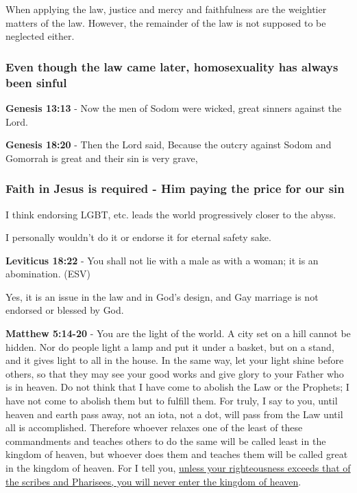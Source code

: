 \documentclass[11pt]{article}
\begin{document}
When applying the law, justice and mercy and faithfulness are the weightier matters of the law.
However, the remainder of the law is not supposed to be neglected either.

\subsubsection{Even though the law came later, homosexuality has always been sinful}
\label{sec:org1ff277d}
\textbf{Genesis 13:13} - Now the men of Sodom were wicked, great sinners against the Lord.

\textbf{Genesis 18:20} - Then the Lord said, Because the outcry against Sodom and Gomorrah is great and their sin is very grave,

\subsubsection{Faith in Jesus is required - Him paying the price for our sin}
\label{sec:org73bcf59}

I think endorsing LGBT, etc. leads the world progressively closer to the abyss.

I personally wouldn't do it or endorse it for eternal safety sake.

\textbf{Leviticus 18:22} - You shall not lie with a male as with a woman; it is an abomination. (ESV)

Yes, it is an issue in the law and in God's design, and Gay marriage is not endorsed or blessed by God.

\textbf{Matthew 5:14-20} - You are the light of the world. A city set on a hill cannot be hidden. Nor do people light a lamp and put it under a basket, but on a stand, and it gives light to all in the house. In the same way, let your light shine before others, so that they may see your good works and give glory to your Father who is in heaven. Do not think that I have come to abolish the Law or the Prophets; I have not come to abolish them but to fulfill them. For truly, I say to you, until heaven and earth pass away, not an iota, not a dot, will pass from the Law until all is accomplished. Therefore whoever relaxes one of the least of these commandments and teaches others to do the same will be called least in the kingdom of heaven, but whoever does them and teaches them will be called great in the kingdom of heaven. For I tell you, \uline{unless your righteousness exceeds that of the scribes and Pharisees, you will never enter the kingdom of heaven}.
\end{document}
